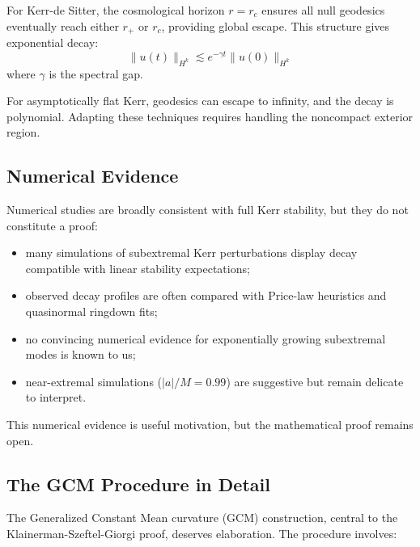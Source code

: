 \documentclass[12pt,a4paper]{article}
\begin{document}
For Kerr-de Sitter, the cosmological horizon $r = r_c$ ensures all null geodesics eventually reach either $r_+$ or $r_c$, providing global escape. This structure gives exponential decay:
\begin{equation}
\|u(t)\|_{H^k} \lesssim e^{-\gamma t}\|u(0)\|_{H^k}
\end{equation}
where $\gamma$ is the spectral gap.

For asymptotically flat Kerr, geodesics can escape to infinity, and the decay is polynomial. Adapting these techniques requires handling the noncompact exterior region.

\subsection{Numerical Evidence}

Numerical studies are broadly consistent with full Kerr stability, but they do not constitute a proof:
\begin{itemize}
    \item many simulations of subextremal Kerr perturbations display decay compatible with linear stability expectations;
    \item observed decay profiles are often compared with Price-law heuristics and quasinormal ringdown fits;
    \item no convincing numerical evidence for exponentially growing subextremal modes is known to us;
    \item near-extremal simulations ($|a|/M = 0.99$) are suggestive but remain delicate to interpret.
\end{itemize}

This numerical evidence is useful motivation, but the mathematical proof remains open.

\subsection{The GCM Procedure in Detail}

The Generalized Constant Mean curvature (GCM) construction, central to the Klainerman-Szeftel-Giorgi proof, deserves elaboration. The procedure involves:
\end{document}
